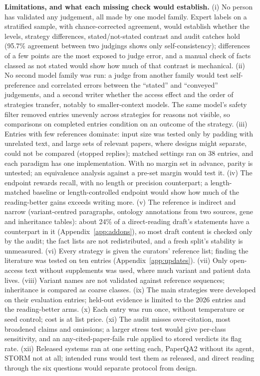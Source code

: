 \documentclass{article} %
\begin{document}
\textbf{Limitations, and what each missing check would establish.} (i) No person has validated any judgement, all made by one model family. Expert labels on a stratified sample, with chance-corrected agreement, would establish whether the levels, strategy differences, stated/not-stated contrast and audit catches hold (95.7\% agreement between two judgings shows only self-consistency); differences of a few points are the most exposed to judge error, and a manual check of facts classed as not stated would show how much of that contrast is mechanical. (ii) No second model family was run: a judge from another family would test self-preference and correlated errors between the ``stated'' and ``conveyed'' judgements, and a second writer whether the access effect and the order of strategies transfer, notably to smaller-context models. The same model's safety filter removed entries unevenly across strategies for reasons not visible, so comparisons on completed entries condition on an outcome of the strategy. (iii) Entries with few references dominate: input size was tested only by padding with unrelated text, and large sets of relevant papers, where designs might separate, could not be compared (stopped replies); matched settings ran on 38 entries, and each paradigm has one implementation. With no margin set in advance, parity is untested; an equivalence analysis against a pre-set margin would test it. (iv) The endpoint rewards recall, with no length or precision counterpart; a length-matched baseline or length-controlled endpoint would show how much of the reading-better gains exceeds writing more. (v) The reference is indirect and narrow (variant-centred paragraphs, ontology annotations from two sources, gene and inheritance tables): about 24\% of a direct-reading draft's statements have a counterpart in it (Appendix~\ref{app:addons}), so most draft content is checked only by the audit; the fact lists are not redistributed, and a fresh split's stability is unmeasured. (vi) Every strategy is given the curators' reference list; finding the literature was tested on ten entries (Appendix~\ref{app:updates}). (vii) Only open-access text without supplements was used, where much variant and patient data lives. (viii) Variant names are not validated against reference sequences; inheritance is compared as coarse classes. (ix) The main strategies were developed on their evaluation entries; held-out evidence is limited to the 2026 entries and the reading-better arms. (x) Each entry was run once, without temperature or seed control; cost is at list price. (xi) The audit misses over-citation, most broadened claims and omissions; a larger stress test would give per-class sensitivity, and an any-cited-paper-fails rule applied to stored verdicts its flag rate. (xii) Released systems ran at one setting each, PaperQA2 without its agent, STORM not at all; intended runs would test them as released, and direct reading through the six questions would separate protocol from design.
\end{document}
